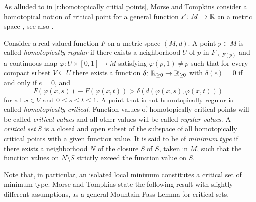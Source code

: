 As alluded to in \cref{r:homotopically critial points}, Morse and Tompkins consider a homotopical notion of critical point for a general function $F \colon M \to \mathbb{R}$ on a metric space \cite[p.~445]{Morse.1939}, see also \cite{Morse.1943}.

\begin{defi}
	Consider a real-valued function $F$ on a metric space $(M,d)$.
	A point $p \in M$ is called \emph{homotopically regular} if there exists a neighborhood $U$ of $p$ in $F_{\leq F(p)}$ and a continuous map $\varphi \colon U \times [0,1] \to M$ satisfying $\varphi(p,1) \neq p$ such that for every compact subset $V \subseteq U$ there exists a function $\delta \colon \mathbb{R}_{\geq 0} \to \mathbb{R}_{\geq 0}$ with
	$\delta(e) = 0$ if and only if $e = 0$, and
	\[
	F(\varphi(x,s)) - F(\varphi(x,t)) > \delta(d(\varphi(x,s),\varphi(x,t)))
	\]
	for all $x \in V$ and $0 \leq s \leq t \leq 1$.
	A point that is not homotopically regular is called \emph{homotopically critical}.
	Function values of  homotopically critical points will be called \emph{critical values} and all other values will be called \emph{regular values}.
	A \emph{critical set} $S$ is a closed and open subset of the subspace of all homotopically critical points with a given function value.
	It is said to be of \emph{minimum type} if there exists a neighborhood $N$ of the closure $\overline{S}$ of $S$, taken in $M$, such that the function values on $N \setminus S$ strictly exceed the function value on $S$.
\end{defi}

Note that, in particular, an isolated local minimum constitutes a critical set of minimum type.
Morse and Tompkins state the following result with slightly different assumptions, as a general Mountain Pass Lemma for critical sets.



